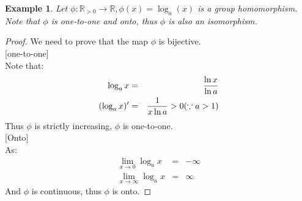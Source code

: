 \documentclass{article}
\theoremstyle{MyNonumberplain}
\theoremstyle{break}
\newtheorem*{proof}{Proof. }
\newcommand{\p}{\phi}
\theoremstyle{break}
\newtheorem{example}{Example}[section]
\theoremstyle{break}
\theoremstyle{definition}
\theoremstyle{break}
\begin{document}
\begin{expbox}
    \begin{example}
        Let $\p : \mathbb{R}_{> 0} \rightarrow \mathbb{R}, \p (x) = \log_a (x)$ is a
        group homomorphism.\\

        Note that $\p$ is one-to-one and onto, thus $\p$ is also an isomorphism. 
    \end{example}
    \begin{prfbox}
        \begin{proof}
            We need to prove that the map $\p$ is bijective.\\

            [one-to-one]\\

            Note that:
            \begin{eqnarray*}
            \log_a x & = & \frac{\ln x}{\ln a}\\
            (\log_a x)' & = & \frac{1}{x \ln a} > 0 \hspace*{\fill} (\because a > 1)
            \end{eqnarray*}
            Thus $\p$ is strictly increasing, $\p$ is one-to-one.\\

            [Onto]\\

            As:
            \begin{eqnarray*}
            \lim_{x \rightarrow 0} \log_a x & = & - \infty\\
            \lim_{x \rightarrow \infty} \log_a x & = & \infty
            \end{eqnarray*}
            And $\p$ is continuous, thus $\p$ is onto.
        \end{proof}
    \end{prfbox}
\end{expbox}
\end{document}
